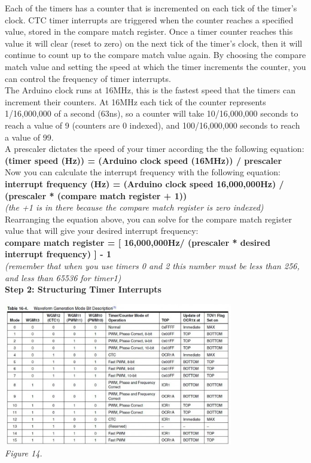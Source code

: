 \documentclass[a4paper]{article}
\begin{document}
\medskip
Each of the timers has a counter that is incremented on each tick of the timer's clock. CTC timer interrupts are triggered when the counter reaches a specified value, stored in the compare match register.  Once a timer counter reaches this value it will clear (reset to zero) on the next tick of the timer's clock, then it will continue to count up to the compare match value again.  By choosing the compare match value and setting the speed at which the timer increments the counter, you can control the frequency of timer interrupts.\bigskip\\
The Arduino clock runs at 16MHz, this is the fastest speed that the timers can increment their counters.  At 16MHz each tick of the counter represents 1/16,000,000 of a second (63ns), so a counter will take 10/16,000,000 seconds to reach a value of 9 (counters are 0 indexed), and 100/16,000,000 seconds to reach a value of 99.\bigskip\\
A prescaler dictates the speed of your timer according the the following equation:\bigskip\\
\textbf{(timer speed (Hz)) = (Arduino clock speed (16MHz)) / prescaler}\bigskip\\
Now you can calculate the interrupt frequency with the following equation:\bigskip\\
\textbf{interrupt frequency (Hz) = (Arduino clock speed 16,000,000Hz) / (prescaler * (compare match register + 1))}\\
\textit{(the +1 is in there because the compare match register is zero indexed)}\bigskip\\
Rearranging the equation above, you can solve for the compare match register value that will give your desired interrupt frequency:\bigskip\\
\textbf{compare match register = [ 16,000,000Hz/ (prescaler * desired interrupt frequency) ] - 1}\\
\textit{(remember that when you use timers 0 and 2 this number must be less than 256, and less than 65536 for timer1)}\bigskip\\
\textbf{Step 2: Structuring Timer Interrupts}
\medskip
\begin{center}
    \includegraphics[width=10cm]{pictures/17.jpeg}\\
    \textit{Figure 14.}\\
\end{center}
\end{document}
